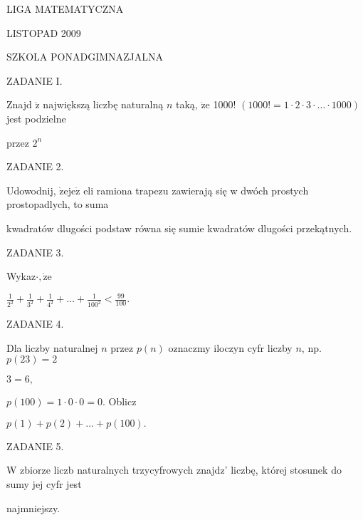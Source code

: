 \documentclass[a4paper,12pt]{article}
\begin{document}
LIGA MATEMATYCZNA

LISTOPAD 2009

SZKOLA PONADGIMNAZJALNA

ZADANIE I.

Znajd $\acute{\mathrm{z}}$ największą liczbę naturalną $n$ taką, $\dot{\mathrm{z}}\mathrm{e}$ 1000! $(1000!=1\cdot 2\cdot 3\cdot\ldots\cdot 1000)$ jest podzielne

przez $2^{n}$

ZADANIE 2.

Udowodnij, $\dot{\mathrm{z}}\mathrm{e}\mathrm{j}\mathrm{e}\dot{\mathrm{z}}$ eli ramiona trapezu zawierają się w dwóch prostych prostopadlych, to suma

kwadratów dlugości podstaw równa się sumie kwadratów dlugości przekątnych.

ZADANIE 3.

Wykaz$\cdot, \dot{\mathrm{z}}\mathrm{e}$

$\displaystyle \frac{1}{2^{2}}+\frac{1}{3^{2}}+\frac{1}{4^{2}}+\ldots+\frac{1}{100^{2}}<\frac{99}{100}.$

ZADANIE 4.

Dla liczby naturalnej $n$ przez $p(n)$ oznaczmy iloczyn cyfr liczby $n$, np. $p(23) = 2$

$3 = 6,$

$p(100)=1\cdot 0\cdot 0=0$. Oblicz

$p(1)+p(2)+\ldots+p(100).$

ZADANIE 5.

W zbiorze liczb naturalnych trzycyfrowych znajdz' liczbę, której stosunek do sumy jej cyfr jest

najmniejszy.
\end{document}
